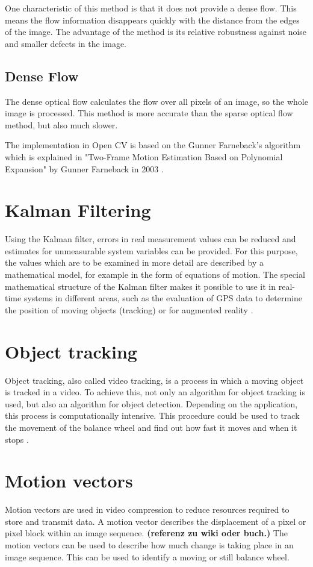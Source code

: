 \documentclass[12pt, a4paper]{report}
\begin{document}
    One characteristic of this method is that it does not provide a dense flow. This means the flow information disappears quickly with the distance from the edges of the image. The advantage of the method is its relative robustness against noise and smaller defects in the image.
    
       \subsection{Dense Flow}
The dense optical flow calculates the flow over all pixels of an image, so the whole image is processed. This method is more accurate than the sparse optical flow method, but also much slower.

The implementation in Open CV is based on the Gunner Farneback's algorithm which is explained in "Two-Frame Motion Estimation Based on Polynomial Expansion" by Gunner Farneback in 2003 \cite{Farneback2003}.
  
   \section{Kalman Filtering} 
   Using the Kalman filter, errors in real measurement values can be reduced and estimates for unmeasurable system variables can be provided. For this purpose, the values which are to be examined in more detail are described by a mathematical model, for example in the form of equations of motion. The special mathematical structure of the Kalman filter makes it possible to use it in real-time systems in different areas, such as the evaluation of GPS data to determine the position of moving objects (tracking) or for augmented reality \cite{Grewal1993}.
   
   \section{Object tracking}
   Object tracking, also called video tracking, is a process in which a moving object is tracked in a video. To achieve this, not only an algorithm for object tracking is used, but also an algorithm for object detection. Depending on the application, this process is computationally intensive. This procedure could be used to track the movement of the balance wheel and find out how fast it moves and when it stops \cite{objectTracking}.
    
 \section{Motion vectors}
 Motion vectors are used in video compression to reduce resources required to store and transmit data. A motion vector describes the displacement of a pixel or pixel block within an image sequence. \textbf{(referenz zu wiki oder buch.)}
 The motion vectors can be used to describe how much change is taking place in an image sequence. This can be used to identify a moving or still balance wheel.
    
\end{document}
